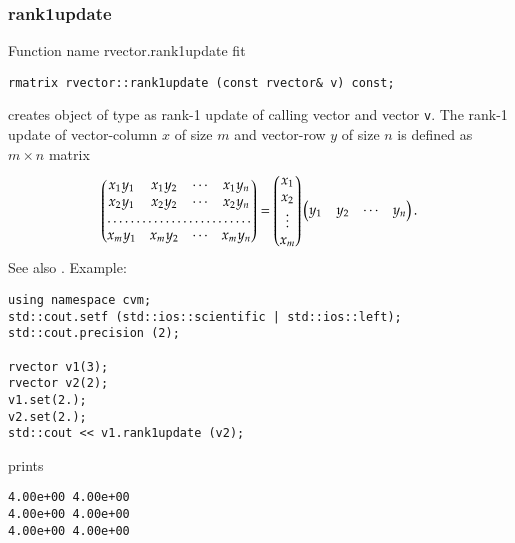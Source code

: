 \subsubsection{rank1update}
Function%
\pdfdest name {rvector.rank1update} fit
\begin{verbatim}
rmatrix rvector::rank1update (const rvector& v) const;
\end{verbatim}
creates  object of type 
as  rank-1 update of
calling vector and vector \verb"v".
The rank-1 update of vector-column $x$ of size $m$ and
vector-row $y$ of size $n$ is defined as $m\times n$ matrix
\begin{equation*}
\begin{pmatrix}
x_1 y_1 & x_1 y_2 & \cdots & x_1 y_n \\
x_2 y_1 & x_2 y_2 & \cdots & x_2 y_n \\
\hdotsfor{4} \\
x_m y_1 & x_m y_2 & \cdots & x_m y_n
\end{pmatrix} =
\begin{pmatrix}
x_1 \\
x_2 \\
\vdots \\
x_m
\end{pmatrix}
\begin{pmatrix}
y_1 & y_2 & \cdots & y_n
\end{pmatrix}.
\end{equation*}
See also .
Example:
\begin{Verbatim}
using namespace cvm;
std::cout.setf (std::ios::scientific | std::ios::left); 
std::cout.precision (2);

rvector v1(3);
rvector v2(2);
v1.set(2.);
v2.set(2.);
std::cout << v1.rank1update (v2);
\end{Verbatim}
prints
\begin{Verbatim}
4.00e+00 4.00e+00
4.00e+00 4.00e+00
4.00e+00 4.00e+00
\end{Verbatim}
\newpage




